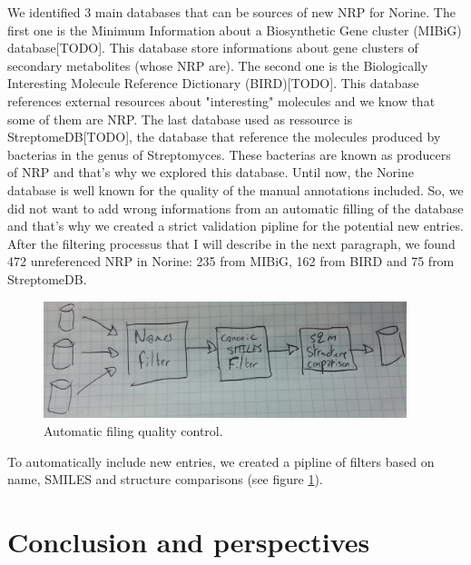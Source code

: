 \documentclass[long, final]{jobim2017}
\begin{document}
We identified 3 main databases that can be sources of new NRP for Norine.
The first one is the Minimum Information about a Biosynthetic Gene cluster (MIBiG) database[TODO].
This database store informations about gene clusters of secondary metabolites (whose NRP are).
The second one is the Biologically Interesting Molecule Reference Dictionary (BIRD)[TODO].
This database references external resources about "interesting" molecules and we know that some of them are NRP.
The last database used as ressource is StreptomeDB[TODO], the database that reference the molecules produced by bacterias in the genus of Streptomyces.
These bacterias are known as producers of NRP and that's why we explored this database.
Until now, the Norine database is well known for the quality of the manual annotations included.
So, we did not want to add wrong informations from an automatic filling of the database and that's why we created a strict validation pipline for the potential new entries.
After the filtering processus that I will describe in the next paragraph, we found 472 unreferenced NRP in Norine: 235 from MIBiG, 162 from BIRD and 75 from StreptomeDB.

 \begin{figure}
   \begin{center}
     \includegraphics[width=400px]{figs/filters.jpg}
   \end{center}
   \caption{Automatic filing quality control.}
   \label{fig:quality}
 \end{figure}

To automatically include new entries, we created a pipline of filters based on name, SMILES and structure comparisons (see figure \ref{fig:quality}).



\section{Conclusion and perspectives}



 
 
\end{document}
